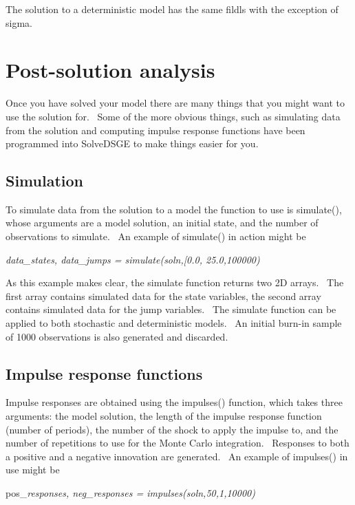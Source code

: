 \documentclass[notitlepage,11pt]{article}
\begin{document}
The solution to a deterministic model has the same fildls with the exception
of sigma.

\section{Post-solution analysis}

Once you have solved your model there are many things that you might want to
use the solution for. \ Some of the more obvious things, such as simulating
data from the solution and computing impulse response functions have been
programmed into SolveDSGE to make things easier for you.

\subsection{Simulation}

To simulate data from the solution to a model the function to use is
simulate(), whose arguments are a model solution, an initial state, and the
number of observations to simulate. \ An example of simulate() in action
might be

\bigskip

\textit{data\_states, data\_jumps = simulate(soln,[0.0, 25.0,100000)}

\bigskip

As this example makes clear, the simulate function returns two 2D arrays. \
The first array contains simulated data for the state variables, the second
array contains simulated data for the jump variables. \ The simulate
function can be applied to both stochastic and deterministic models. \ An
initial burn-in sample of 1000 observations is also generated and discarded.

\subsection{Impulse response functions}

Impulse responses are obtained using the impulses() function, which takes
three arguments: the model solution, the length of the impulse response
function (number of periods), the number of the shock to apply the impulse
to, and the number of repetitions to use for the Monte Carlo integration. \
Responses to both a positive and a negative innovation are generated. \ An
example of impulses() in use might be

\bigskip

pos\_\textit{responses, neg\_responses = impulses(soln,50,1,10000)}
\end{document}

